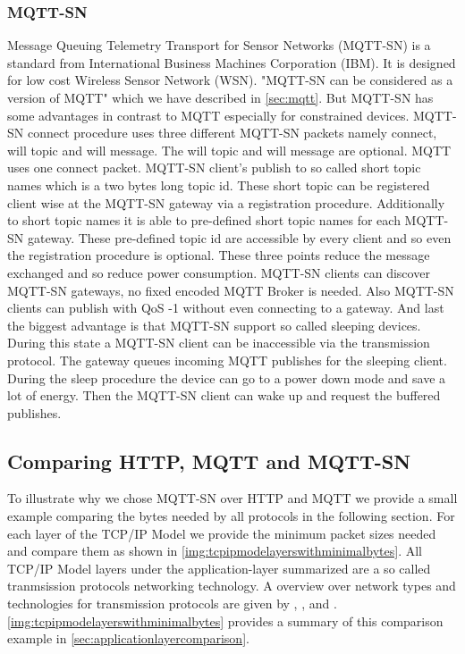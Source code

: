 \subsubsection{MQTT-SN}\label{sec:mqttsn}
Message Queuing Telemetry Transport for Sensor Networks (MQTT-SN) is a standard from International Business Machines Corporation (IBM).
It is designed for low cost Wireless Sensor Network (WSN)\cite{mqttsnstandard}.
"MQTT-SN can be considered as a version of MQTT"\cite[p.4]{mqttsnstandard} which we have described in \autoref{sec:mqtt}.
But MQTT-SN has some advantages in contrast to MQTT especially for constrained devices.
MQTT-SN connect procedure uses three different MQTT-SN packets namely connect, will topic and will message.
The will topic and will message are optional.
MQTT uses one connect packet.
MQTT-SN client's publish to so called short topic names which is a two bytes long topic id.
These short topic can be registered client wise at the MQTT-SN gateway via a registration procedure.
Additionally to short topic names it is able to pre-defined short topic names for each MQTT-SN gateway.
These pre-defined topic id are accessible by every client and so even the registration procedure is optional.
These three points reduce the message exchanged and so reduce power consumption.
MQTT-SN clients can discover MQTT-SN gateways, no fixed encoded MQTT Broker is needed.
Also MQTT-SN clients can publish with QoS -1 without even connecting to a gateway.
And last the biggest advantage is that MQTT-SN support so called sleeping devices.
During this state a MQTT-SN client can be inaccessible via the transmission protocol.
The gateway queues incoming MQTT publishes for the sleeping client.
During the sleep procedure the device can go to a power down mode and save a lot of energy.
Then the MQTT-SN client can wake up and request the buffered publishes\cite{mqttsnstandard}.

\subsection{Comparing HTTP, MQTT and MQTT-SN}\label{sec:comparinghttpmqttmqttsn}
To illustrate why we chose MQTT-SN over HTTP and MQTT we provide a small example comparing the bytes needed by all protocols in the following section.
For each layer of the TCP/IP Model we provide the minimum packet sizes needed and compare them as shown in \autoref{img:tcpipmodelayerswithminimalbytes}.
All TCP/IP Model layers under the application-layer summarized are a so called tranmsission protocols networking technology.
A overview over network types and technologies for transmission protocols are given by \cite{citeulike:2134830}, \cite{DinushaRathnayaka2012}, \cite{s120911734} and \cite{wirelesshomeautomationnetworks}.
\autoref{img:tcpipmodelayerswithminimalbytes} provides a summary of this comparison example in \autoref{sec:applicationlayercomparison}.
